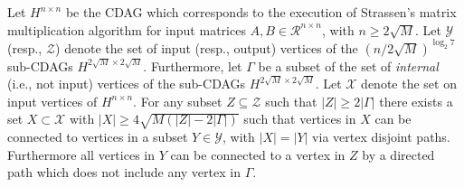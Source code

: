 \documentclass[a4paper,UKenglish]{lipics-v2016}
\newcommand{\ri}{\mathcal{R}}
\begin{document}
\begin{lemma}\label{lem:stra_part1}
Let $H^{n\times n}$ be the CDAG which corresponds to the execution of Strassen's matrix multiplication algorithm for input matrices $A,B\in \ri^{n\times n}$, with $n\geq 2\sqrt{M}$. Let $\mathcal{Y}$ (resp., $\mathcal{Z}$) denote the set of input (resp., output) vertices of the $\left(n/2\sqrt{M}\right)^{\log_2 7}$ sub-CDAGs $H^{2\sqrt{M}\times 2\sqrt{M}}$. Furthermore, let $\Gamma$ be a subset of the set of \emph{internal} (i.e., not input) vertices of the sub-CDAGs $H^{2\sqrt{M}\times 2\sqrt{M}}$. Let $\mathcal{X}$ denote the set on input vertices of $H^{n\times n}$. For any subset $Z\subseteq \mathcal{Z}$ such that $|Z|\geq 2|\Gamma|$ there exists a set $X\subset\mathcal{X}$ with $|X|\geq 4\sqrt{M\left(|Z|-2|\Gamma|\right)}$ such that  vertices in $X$ can be connected to vertices in a subset $Y\in \mathcal{Y}$, with $|X|=|Y|$ via vertex disjoint paths. Furthermore all vertices in $Y$ can be connected to a vertex in $Z$ by a directed path which does not include any vertex in $\Gamma$.
\end{lemma}
\end{document}
